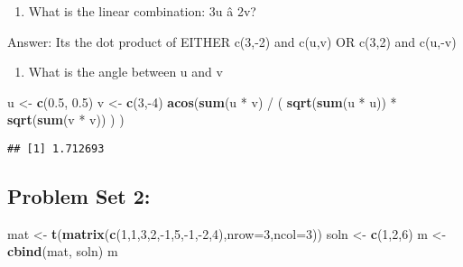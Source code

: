 \documentclass[]{article}
\newenvironment{Shaded}{\begin{snugshade}}{\end{snugshade}}
\newcommand{\KeywordTok}[1]{\textcolor[rgb]{0.13,0.29,0.53}{\textbf{{#1}}}}
\newcommand{\DataTypeTok}[1]{\textcolor[rgb]{0.13,0.29,0.53}{{#1}}}
\newcommand{\DecValTok}[1]{\textcolor[rgb]{0.00,0.00,0.81}{{#1}}}
\newcommand{\FloatTok}[1]{\textcolor[rgb]{0.00,0.00,0.81}{{#1}}}
\newcommand{\StringTok}[1]{\textcolor[rgb]{0.31,0.60,0.02}{{#1}}}
\newcommand{\NormalTok}[1]{{#1}}
\begin{document}
\begin{enumerate}
\def\labelenumi{(\arabic{enumi})}
\setcounter{enumi}{2}
\itemsep1pt\parskip0pt
\item
  What is the linear combination: 3u â 2v?
\end{enumerate}

Answer: Its the dot product of EITHER c(3,-2) and c(u,v) OR c(3,2) and
c(u,-v)

\begin{enumerate}
\def\labelenumi{(\arabic{enumi})}
\setcounter{enumi}{3}
\itemsep1pt\parskip0pt
\item
  What is the angle between u and v
\end{enumerate}

\begin{Shaded}
\begin{Highlighting}[]
\NormalTok{u <-}\StringTok{ }\KeywordTok{c}\NormalTok{(}\FloatTok{0.5}\NormalTok{, }\FloatTok{0.5}\NormalTok{)}
\NormalTok{v <-}\StringTok{ }\KeywordTok{c}\NormalTok{(}\DecValTok{3}\NormalTok{,-}\DecValTok{4}\NormalTok{)}
\KeywordTok{acos}\NormalTok{(}\KeywordTok{sum}\NormalTok{(u *}\StringTok{ }\NormalTok{v) /}\StringTok{ }\NormalTok{( }\KeywordTok{sqrt}\NormalTok{(}\KeywordTok{sum}\NormalTok{(u *}\StringTok{ }\NormalTok{u)) *}\StringTok{ }\KeywordTok{sqrt}\NormalTok{(}\KeywordTok{sum}\NormalTok{(v *}\StringTok{ }\NormalTok{v)) ) )}
\end{Highlighting}
\end{Shaded}

\begin{verbatim}
## [1] 1.712693
\end{verbatim}

\subsection{Problem Set 2:}\label{problem-set-2}

\begin{Shaded}
\begin{Highlighting}[]
\NormalTok{mat <-}\StringTok{ }\KeywordTok{t}\NormalTok{(}\KeywordTok{matrix}\NormalTok{(}\KeywordTok{c}\NormalTok{(}\DecValTok{1}\NormalTok{,}\DecValTok{1}\NormalTok{,}\DecValTok{3}\NormalTok{,}\DecValTok{2}\NormalTok{,-}\DecValTok{1}\NormalTok{,}\DecValTok{5}\NormalTok{,-}\DecValTok{1}\NormalTok{,-}\DecValTok{2}\NormalTok{,}\DecValTok{4}\NormalTok{),}\DataTypeTok{nrow=}\DecValTok{3}\NormalTok{,}\DataTypeTok{ncol=}\DecValTok{3}\NormalTok{))}
\NormalTok{soln <-}\StringTok{ }\KeywordTok{c}\NormalTok{(}\DecValTok{1}\NormalTok{,}\DecValTok{2}\NormalTok{,}\DecValTok{6}\NormalTok{)}
\NormalTok{m <-}\StringTok{ }\KeywordTok{cbind}\NormalTok{(mat, soln)}
\NormalTok{m}
\end{Highlighting}
\end{Shaded}
\end{document}
